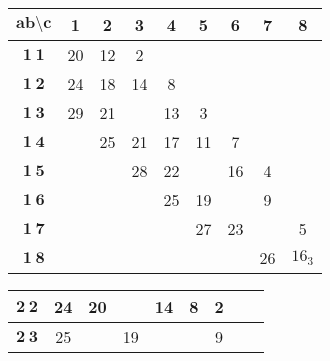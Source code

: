 \documentclass[a4paper,12pt]{report}
\begin{document}
\begin{center}
\begin{tabular}{|c||c|c|c|c|c|c|c|c|}\hline
$\textbf{ab} \setminus \textbf{c}$  & \textbf{1} & \textbf{2} & \textbf{3} & \textbf{4} & \textbf{5} & \textbf{6} & \textbf{7} & \textbf{8} \\
\hline \hline

$\textbf{1}\:\textbf{1}$ & 20 & 12 & 2 & \hspace{6mm} & \hspace{6mm} & \hspace{6mm} & \hspace{6mm} & \hspace{6mm} \\
\hline

$\textbf{1}\:\textbf{2}$ & 24 & 18 & 14 & 8 & & & & \\ \hline

$\textbf{1}\:\textbf{3}$ & 29 & 21 & \hspace{6mm} & 13 & 3 & & & \\ \hline

$\textbf{1}\:\textbf{4}$ & \hspace{6mm} & 25 & 21 & 17 & 11 & 7 & & \\ \hline

$\textbf{1}\:\textbf{5}$ &  & \hspace{6mm} & 28 & 22 & & 16 & 4 & \\ \hline

$\textbf{1}\:\textbf{6}$ &  &  & & 25 & 19 & & 9 &  \\ \hline

$\textbf{1}\:\textbf{7}$ &  &  & &  & 27 & 23 & & 5 \\ \hline

$\textbf{1}\:\textbf{8}$ &  &  & &  & & & 26 & $16_{3}$\\ \hline
\end{tabular}

\begin{tabular}{|c||c|c|c|c|c|c|c|c|}\hline
\hspace{1.5mm} $\textbf{2}\:\textbf{2}$ \hspace{1mm} & 24 & 20  & \hspace{6mm} & 14  & 8 & 2 & \hspace{6mm} & \hspace{6mm} \\
\hline

$\textbf{2}\:\textbf{3}$ & 25 & \hspace{6mm} & 19 & \hspace{6mm} & \hspace{6mm} & 9 & & \\
\hline


\end{tabular}
\end{center}
\end{document}
